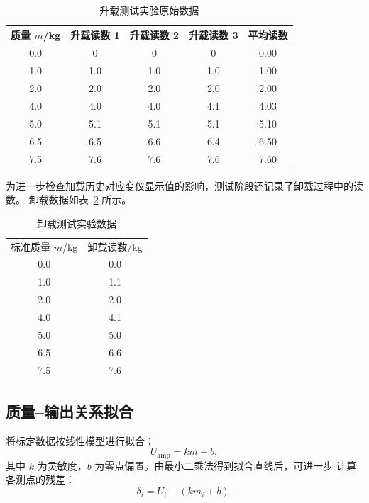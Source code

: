 \documentclass[UTF8,a4paper,zihao=5]{ctexart}
\begin{document}
\begin{table}[htbp]
  \centering
  \begin{tabular}{ccccc}
    \toprule
    质量 \(m\)/kg & 升载读数 1 & 升载读数 2 & 升载读数 3 & 平均读数 \\
    \midrule
    0.0 & 0 & 0 & 0 & 0.00 \\
    1.0 & 1.0 & 1.0 & 1.0 & 1.00 \\
    2.0 & 2.0 & 2.0 & 2.0 & 2.00 \\
    4.0 & 4.0 & 4.0 & 4.1 & 4.03 \\
    5.0 & 5.1 & 5.1 & 5.1 & 5.10 \\
    6.5 & 6.5 & 6.6 & 6.4 & 6.50 \\
    7.5 & 7.6 & 7.6 & 7.6 & 7.60 \\
    \bottomrule
  \end{tabular}
  \caption{升载测试实验原始数据}
  \label{tab:test-raw-data}
\end{table}

为进一步检查加载历史对应变仪显示值的影响，测试阶段还记录了卸载过程中的读数。
卸载数据如表~\ref{tab:unload-raw-data} 所示。

\begin{table}[htbp]
  \centering
  \begin{tabular}{cc}
    \toprule
    标准质量 \(m\)/kg & 卸载读数/kg \\
    0.0 & 0.0  \\
    1.0 & 1.1  \\
    2.0 & 2.0  \\
    4.0 & 4.1  \\
    5.0 & 5.0  \\
    6.5 & 6.6  \\
    7.5 & 7.6  \\
    \bottomrule
  \end{tabular}
  \caption{卸载测试实验数据}
  \label{tab:unload-raw-data}
\end{table}

\subsection{质量--输出关系拟合}

将标定数据按线性模型进行拟合：
\begin{equation}
  U_{\mathrm{amp}} = k m + b,
  \label{eq:linear-fit}
\end{equation}
其中 \(k\) 为灵敏度，\(b\) 为零点偏置。由最小二乘法得到拟合直线后，可进一步
计算各测点的残差：
\begin{equation}
  \delta_i = U_i - (k m_i+b).
  \label{eq:residual}
\end{equation}
\end{document}
